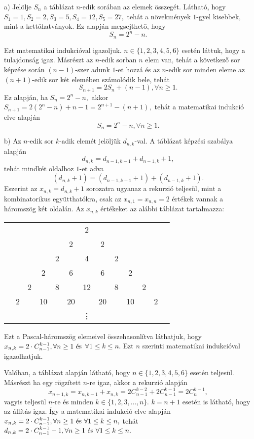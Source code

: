\begin{solution}
a) Jelölje $S_{n}$ a táblázat $n$-edik sorában az elemek összegét.
Látható, hogy $S_{1}=1,S_{2}=2,S_{3}=5,S_{4}=12,S_{5}=27,$ tehát
a növekmények $1$-gyel kisebbek, mint a kettőhatványok. Ez alapján
megsejthető, hogy 
\[
S_{n}=2^{n}-n.
\]

Ezt matematikai indukcióval igazoljuk. $n\in\{1,2,3,4,5,6\}$ esetén
láttuk, hogy a tulajdonság igaz. Másrészt az $n$-edik sorban $n$
elem van, tehát a következő sor képzése során $(n-1)$-szer adunk
$1$-et hozzá és az $n$-edik sor minden eleme az $(n+1)$-edik sor
két elemében számolódik bele, tehát 
\[
S_{n+1}=2S_{n}+(n-1),\forall n\geq1.
\]
Ez alapján, ha $S_{n}=2^{n}-n,$ akkor $S_{n+1}=2(2^{n}-n)+n-1=2^{n+1}-(n+1),$
tehát a matematikai indukció elve alapján 
\[
S_{n}=2^{n}-n,\forall n\geq1.
\]

b) Az $n$-edik sor $k$-adik elemét jelöljük $d_{n,k}$-val. A táblázat
képzési szabálya alapján 
\[
d_{n,k}=d_{n-1,k-1}+d_{n-1,k}+1,
\]
tehát mindkét oldalhoz $1$-et adva 
\[
(d_{n,k}+1)=(d_{n-1,k-1}+1)+(d_{n-1,k}+1).
\]
Eszerint az $x_{n,k}=d_{n,k}+1$ sorozatra ugyanaz a rekurzió teljesül,
mint a kombinatorikus együtthatókra, csak az $x_{n,1}=x_{n,n}=2$
értékek vannak a háromszög két oldalán. Az $x_{n,k}$ értékeket az
alábbi táblázat tartalmazza:
\begin{center}
\begin{tabular}{ccccccccccccc}
 &  &  &  &  &  & 2 &  &  &  &  &  & \tabularnewline
 &  &  &  &  & 2 &  & 2 &  &  &  &  & \tabularnewline
 &  &  &  & 2 &  & 4 &  & 2 &  &  &  & \tabularnewline
 &  &  & 2 &  & 6 &  & 6 &  & 2 &  &  & \tabularnewline
 &  & 2 &  & 8 &  & 12 &  & 8 &  & 2 &  & \tabularnewline
 & 2 &  & 10 &  & 20 &  & 20 &  & 10 &  & 2 & \tabularnewline
 &  &  &  &  &  & \vdots &  &  &  &  &  & \tabularnewline
\end{tabular}
\par\end{center}
Ezt a Pascal-háromszög elemeivel összehasonlítva láthatjuk, hogy $x_{n,k}=2\cdot C_{n-1}^{k-1},\forall n\geq1\textnormal{ és}$
\linebreak{}
$\forall1\leq k\leq n$. Ezt $n$ szerinti matematikai indukcióval
igazolhatjuk.

Valóban, a táblázat alapján látható, hogy $n\in\{1,2,3,4,5,6\}$ esetén
teljesül. Másrészt ha egy rögzített $n$-re igaz, akkor a rekurzió
alapján 
\[
x_{n+1,k}=x_{n,k-1}+x_{n,k}=2C_{n-1}^{k-2}+2C_{n-1}^{k-1}=2C_{n}^{k-1},
\]
vagyis teljesül $n$-re és minden $k\in\{1,2,3,\ldots,n\}$. $k=n+1$
esetén is látható, hogy az állítás igaz. Így a matematikai indukció
elve alapján $x_{n,k}=2\cdot C_{n-1}^{k-1},\forall n\geq1\textnormal{ és }\forall1\leq k\leq n,$
tehát $d_{n,k}=2\cdot C_{n-1}^{k-1}-1,\forall n\geq1\textnormal{ és }\forall1\leq k\leq n.$


\end{solution}
